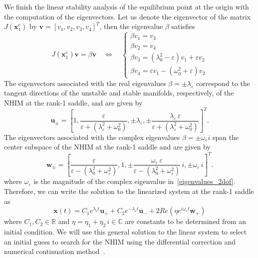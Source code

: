 \documentclass{ws-ijbc}
\begin{document}
We finish the linear stability analysis of the equilibrium point at the origin with the computation of the eigenvectors. Let us denote the eigenvector of the matrix $J(\mathbf{x}_1^e)$ by $\mathbf{v} = \left[v_1,v_2,v_3,v_4\right]^T$, then the eigenvalue $\beta$ satisfies
\begin{equation}
J(\mathbf{x}_1^e) \mathbf{v} = \beta \mathbf{v} \quad\Leftrightarrow\quad 
\begin{cases}
\beta v_1 = v_3 \\[-.1cm]
\beta v_2 = v_4 \\[-.1cm]
\beta v_3 = \left(\lambda_0^2 - \varepsilon\right) v_1 + \varepsilon v_2 \\[-.1cm]
\beta v_4 = \varepsilon v_1 - \left(\omega_0^2 + \varepsilon\right) v_2
\end{cases}
\end{equation}
The eigenvectors associated with the real eigenvalues $\beta = \pm \lambda_{\varepsilon}$ correspond to the tangent directions of the unstable and stable manifolds, respectively, of the NHIM at the rank-1 saddle, and are given by
\begin{equation}
\mathbf{u}_{\pm} = \left[1,\frac{\varepsilon}{\varepsilon + \left(\lambda^2_\varepsilon + \omega^2_0\right)},\pm\lambda_{\varepsilon},\pm\frac{\lambda_{\varepsilon} \, \varepsilon}{\varepsilon + \left(\lambda^2_\varepsilon + \omega^2_0\right)}\right]^T.
\label{saddle_eigenv}
\end{equation}
The eigenvectors associated with the complex eigenvalues $\beta = \pm \omega_\varepsilon i$ span the center subspace of the NHIM at the rank-1 saddle and are given by
\begin{equation}
\mathbf{w}_{\pm} = \left[\frac{\varepsilon}{\varepsilon - \left(\lambda^2_0 + \omega^2_\varepsilon\right)},1,\pm\frac{\omega_{\varepsilon} \, \varepsilon}{\varepsilon - \left(\lambda^2_0 + \omega^2_\varepsilon\right)}\, i,\pm\omega_{\varepsilon}\, i\right]^T.
\label{center_eigenv}
\end{equation}
where $\omega_\varepsilon$ is the magnitude of the complex eigenvalue in~\eqref{eigenvalues_2dof}. Therefore, we can write the solution to the linearized system at the rank-1 saddle as
\begin{equation}
\mathbf{x}(t) = C_1 e^{\lambda_\varepsilon t} \mathbf{u}_{+} + C_2 e^{-\lambda_\varepsilon t} \mathbf{u}_{-} + 2 Re\left(\eta e^{i\omega_\varepsilon t} \mathbf{w}_{+}\right)
\label{geneq_lin_ham}
\end{equation}
where $C_1,C_2 \in \mathbb{R}$ and $\eta = \eta_1 + \eta_2 \, i \in \mathbb{C}$ are constants to be determined from an initial condition. We will use this general solution to the linear system to select an initial guess to search for the NHIM using the differential correction and numerical continuation method~\cite{Koon2011}. 
\end{document}
